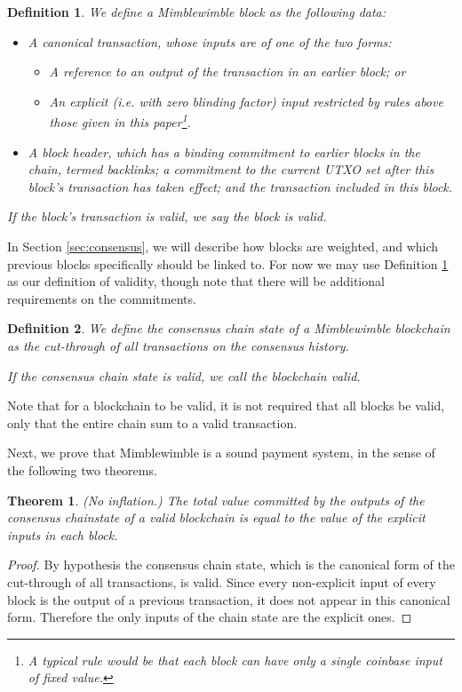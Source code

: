 \documentclass[letterpaper]{article}
\newtheorem{thrm}{Theorem}
\newtheorem{defn}{Definition}
\begin{document}
\begin{defn} We define a \emph{Mimblewimble block} as the following data:
\begin{itemize}
\item A canonical transaction, whose inputs are of one of the two forms:
\begin{itemize}
\item A reference to an output of the transaction in an earlier block; or
\item An explicit (\emph{i.e.} with zero blinding factor) input restricted
by rules above those given in this paper\footnote{A typical rule would be
that each block can have only a single \emph{coinbase input} of fixed
value.}.
\end{itemize}
\item A \emph{block header}, which has a binding commitment to earlier
blocks in the chain, termed \emph{backlinks}; a commitment to the current
UTXO set after this block's transaction has taken effect; and the transaction
included in this block.
\end{itemize}
If the block's transaction is valid, we say the block is \emph{valid}.
\label{defn:blockvalid}
\end{defn}

In Section \ref{sec:consensus}, we will describe how blocks are weighted,
and which previous blocks specifically should be linked to. For now we may
use Definition \ref{defn:blockvalid} as our definition of validity, though
note that there will be additional requirements on the commitments.

\begin{defn} We define the \emph{consensus chain state} of a Mimblewimble
blockchain as the cut-through of all transactions on the consensus history.

If the consensus chain state is valid, we call the blockchain \emph{valid}.
\end{defn}
Note that for a blockchain to be valid, it is not required that all blocks
be valid, only that the entire chain sum to a valid transaction.

Next, we prove that Mimblewimble is a sound payment system, in the sense
of the following two theorems.
\begin{thrm} (No inflation.) The total value committed by the outputs of
the consensus chainstate of a valid blockchain is equal to the value of
the explicit inputs in each block.
\end{thrm}
\begin{proof} By hypothesis the consensus chain state, which is the canonical
form of the cut-through of all transactions, is valid. Since every non-explicit
input of every block is the output of a previous transaction, it does not appear
in this canonical form. Therefore the only inputs of the chain state are the
explicit ones.
\end{proof}
\end{document}
